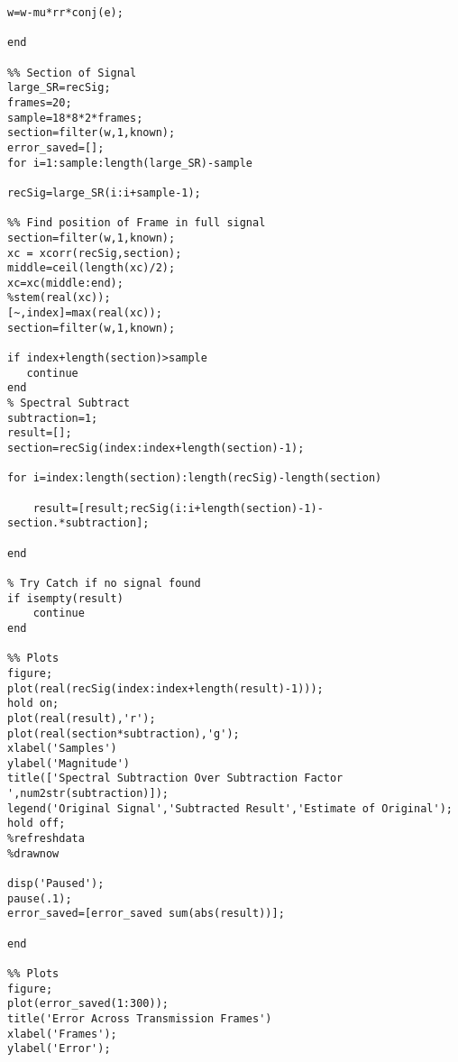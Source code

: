 \begin{lstlisting}[breaklines]
    w=w-mu*rr*conj(e);

end

%% Section of Signal
large_SR=recSig;
frames=20;
sample=18*8*2*frames;
section=filter(w,1,known);
error_saved=[];
for i=1:sample:length(large_SR)-sample

recSig=large_SR(i:i+sample-1);

%% Find position of Frame in full signal
section=filter(w,1,known);
xc = xcorr(recSig,section);
middle=ceil(length(xc)/2);
xc=xc(middle:end);
%stem(real(xc));
[~,index]=max(real(xc));
section=filter(w,1,known);

if index+length(section)>sample
   continue 
end
% Spectral Subtract
subtraction=1;
result=[];
section=recSig(index:index+length(section)-1);

for i=index:length(section):length(recSig)-length(section)
    
    result=[result;recSig(i:i+length(section)-1)-section.*subtraction];
    
end

% Try Catch if no signal found
if isempty(result)
    continue
end

%% Plots
figure;
plot(real(recSig(index:index+length(result)-1)));
hold on;
plot(real(result),'r');
plot(real(section*subtraction),'g');
xlabel('Samples')
ylabel('Magnitude')
title(['Spectral Subtraction Over Subtraction Factor ',num2str(subtraction)]);
legend('Original Signal','Subtracted Result','Estimate of Original');
hold off;
%refreshdata
%drawnow

disp('Paused');
pause(.1);
error_saved=[error_saved sum(abs(result))];

end

%% Plots
figure;
plot(error_saved(1:300));
title('Error Across Transmission Frames')
xlabel('Frames');
ylabel('Error');



\end{lstlisting}
